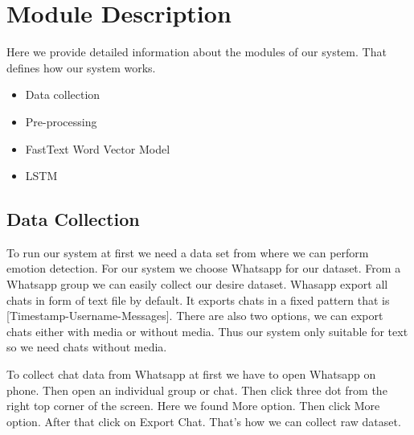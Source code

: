 \section{Module Description}
Here we provide detailed information about the modules of our system. That defines how our system works.
\begin{itemize}
\item Data collection
\item Pre-processing
\item FastText Word Vector Model
\item LSTM
\end{itemize}

\subsection{Data Collection}
To run our system at first we need a data set from where we can perform emotion detection. For our system we choose Whatsapp for our dataset. From a Whatsapp group we can easily collect our desire dataset. Whasapp export all chats in form of text file by default. It exports chats in a fixed pattern that is [Timestamp-Username-Messages]. There are also two options, we can export chats either with media or without media. Thus our system only suitable for text so we need chats without media.
 
To collect chat data from Whatsapp at first we have to open Whatsapp on phone. Then open an individual group or chat. Then click three dot from the right top corner of the screen. Here we found More option. Then click More option. After that click on Export Chat. That's how we can collect raw dataset.

